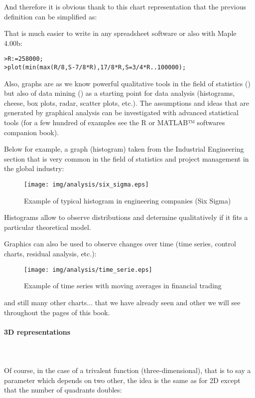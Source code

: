 And therefore it is obvious thank to this chart representation that the previous definition can be simplified as:

	

	That is much easier to write in any spreadsheet software or also with Maple 4.00b:

\texttt{>R:=258000;}\\
\texttt{>plot(min(max(R/8,S-7/8*R),17/8*R,S=3/4*R..100000);}

	Also, graphs are as we know powerful qualitative tools in the field of statistics () but also of data mining () as a starting point for data analysis (histograms, cheese, box plots, radar, scatter plots, etc.). The assumptions and ideas that are generated by graphical analysis can be investigated with advanced statistical tools (for a few hundred of examples see the R  or MATLAB™ softwares companion book).

Below for example, a graph (histogram) taken from the Industrial Engineering section that is very common in the field of statistics and project management in the global industry:

\begin{figure}[H]
\centering
\texttt{[image: img/analysis/six\_sigma.eps]}
\caption{Example of typical histogram in engineering companies (Six Sigma)}
\end{figure}

Histograms allow to observe distributions and determine qualitatively if it fits a particular theoretical model.

Graphics can also be used to observe changes over time (time series, control charts, residual analysis, etc.):

\begin{figure}[H]
\centering
\texttt{[image: img/analysis/time\_serie.eps]}
\caption{Example of time series with moving averages in financial trading}
\end{figure}

and still many other charts... that we have already seen and other we will see throughout the pages of this book.

\paragraph{3D representations}\mbox{}\\\\
Of course, in the case of a trivalent function (three-dimensional), that is to say a parameter which depends on two other, the idea is the same as for 2D except that the number of quadrants doubles:

